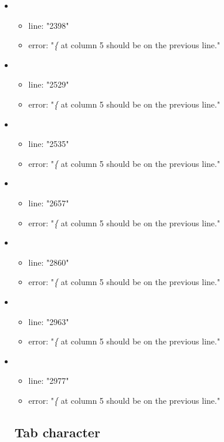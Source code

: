 \begin{itemize}
\begin{itemize}
	\end{itemize}
	\item 
	\begin{itemize} 
		\item line: "2398" 
		\item error: "\emph{\{} at column 5 should be on the previous line." 
	\end{itemize}
	\item 
	\begin{itemize} 
		\item line: "2529" 
		\item error: "\emph{\{} at column 5 should be on the previous line." 
	\end{itemize}
	\item 
	\begin{itemize} 
		\item line: "2535" 
		\item error: "\emph{\{} at column 5 should be on the previous line." 
	\end{itemize}
	\item 
	\begin{itemize} 
		\item line: "2657" 
		\item error: "\emph{\{} at column 5 should be on the previous line." 
	\end{itemize}
	\item 
	\begin{itemize} 
		\item line: "2860" 
		\item error: "\emph{\{} at column 5 should be on the previous line." 
	\end{itemize}
	\item 
	\begin{itemize} 
		\item line: "2963" 
		\item error: "\emph{\{} at column 5 should be on the previous line." 
	\end{itemize}
	\item 
	\begin{itemize} 
		\item line: "2977" 
		\item error: "\emph{\{} at column 5 should be on the previous line." 
	\end{itemize}
\subsection{Tab character} %
\label{sub:tab}



\end{itemize}
